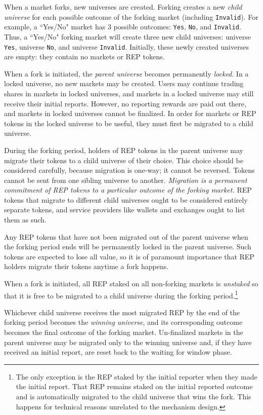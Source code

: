 \documentclass[floatfix,reprint,nofootinbib,amsmath,amssymb,epsfig,pre,floats,letterpaper,groupedaffiliation]{revtex4-1}
\theoremstyle{definition}
\theoremstyle{definition}
\begin{document}
When a market forks, new universes are created.  Forking creates a new \textit{child universe} for each possible outcome of the forking market (including \texttt{Invalid}).  For example, a ``Yes/No" market has 3 possible outcomes: \texttt{Yes}, \texttt{No}, and \texttt{Invalid}.  Thus, a ``Yes/No" forking market will create three new child universes: universe \texttt{Yes}, universe \texttt{No}, and universe \texttt{Invalid}.  Initially, these newly created universes are empty: they contain no markets or REP tokens.

When a fork is initiated, the \textit{parent universe} becomes permanently \textit{locked}.  In a locked universe, no new markets may be created.  Users may continue trading shares in markets in locked universes, and markets in a locked universe may still receive their initial reports. However, no reporting rewards are paid out there, and markets in locked universes cannot be finalized.  In order for markets or REP tokens in the locked universe to be useful, they must first be migrated to a child universe.

During the forking period, holders of REP tokens in the parent universe may migrate their tokens to a child universe of their choice.  This choice should be considered carefully, because migration is one-way; it cannot be reversed.  Tokens cannot be sent from one sibling universe to another.  \textit{Migration is a permanent commitment of REP tokens to a particular outcome of the forking market.}  REP tokens that migrate to different child universes ought to be considered entirely separate tokens, and service providers like wallets and exchanges ought to list them as such.

Any REP tokens that have not been migrated out of the parent universe when the forking period ends will be permanently locked in the parent universe. Such tokens are expected to lose all value, so it is of paramount importance that REP holders migrate their tokens anytime a fork happens.

When a fork is initiated, all REP staked on all non-forking markets is \textit{unstaked} so that it is free to be migrated to a child universe during the forking period.\footnote{The only exception is the REP staked by the initial reporter when they made the initial report.  That REP remains staked on the initial reported outcome and is automatically migrated to the child universe that wins the fork. This happens for technical reasons unrelated to the mechanism design.}

Whichever child universe receives the most migrated REP by the end of the forking period becomes the \textit{winning universe}, and its corresponding outcome becomes the final outcome of the forking market.  Un-finalized markets in the parent universe may be migrated only to the winning universe and, if they have received an initial report, are reset back to the waiting for window phase.
\end{document}
